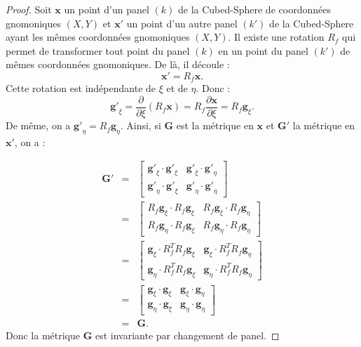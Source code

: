 \begin{proof}
Soit $\mathbf{x}$ un point d'un panel $(k)$ de la Cubed-Sphere de coordonnées gnomoniques $(X,Y)$ et $\mathbf{x}'$ un point d'un autre panel $(k')$ de la Cubed-Sphere ayant les mêmes coordonnées gnomoniques $(X,Y)$. Il existe une rotation $R_f$ qui permet de transformer tout point du panel $(k)$ en un point du panel $(k')$ de mêmes coordonnées gnomoniques. De là, il découle :
\begin{equation}
\mathbf{x}' = R_f \mathbf{x}.
\end{equation}
Cette rotation est indépendante de $\xi$ et de $\eta$. Donc :
\begin{equation}
\mathbf{g'}_{\xi} = \dfrac{\partial}{\partial \xi} \left( R_f \mathbf{x} \right) = R_f \dfrac{\partial \mathbf{x}}{\partial \xi}  = R_f \mathbf{g}_{\xi}.
\end{equation}
De même, on a $\mathbf{g'}_{\eta} = R_f\mathbf{g}_{\eta}$.
Ainsi, si $\mathbf{G}$ est la métrique en $\mathbf{x}$ et $\mathbf{G}'$ la métrique en $\mathbf{x}'$, on a :

\begin{equation*}
\begin{array}{rcl}
\mathbf{G}' &=& \begin{bmatrix}
\mathbf{g'}_{\xi} \cdot \mathbf{g'}_{\xi} & \mathbf{g'}_{\xi} \cdot \mathbf{g'}_{\eta} \\
\mathbf{g'}_{\eta} \cdot \mathbf{g'}_{\xi} & \mathbf{g'}_{\eta} \cdot \mathbf{g'}_{\eta}
\end{bmatrix}\\[10pt]
&=&
\begin{bmatrix}
R_f \mathbf{g}_{\xi} \cdot R_f \mathbf{g}_{\xi} & R_f \mathbf{g}_{\xi} \cdot R_f \mathbf{g}_{\eta} \\
R_f \mathbf{g}_{\eta} \cdot R_f \mathbf{g}_{\xi} & R_f \mathbf{g}_{\eta} \cdot R_f \mathbf{g}_{\eta}
\end{bmatrix}\\[10pt]
&=&
\begin{bmatrix}
\mathbf{g}_{\xi} \cdot R_f^{T} R_f \mathbf{g}_{\xi} & \mathbf{g}_{\xi} \cdot  R_f^{T} R_f \mathbf{g}_{\eta} \\
\mathbf{g}_{\eta} \cdot  R_f^{T} R_f \mathbf{g}_{\xi} & \mathbf{g}_{\eta} \cdot  R_f^{T} R_f \mathbf{g}_{\eta}
\end{bmatrix}\\[10pt]
&=& \begin{bmatrix}
\mathbf{g}_{\xi} \cdot \mathbf{g}_{\xi} & \mathbf{g}_{\xi} \cdot \mathbf{g}_{\eta} \\
\mathbf{g}_{\eta} \cdot \mathbf{g}_{\xi} & \mathbf{g}_{\eta} \cdot \mathbf{g}_{\eta}
\end{bmatrix}\\[10pt]
& = & \mathbf{G}.
\end{array}
\end{equation*}
Donc la métrique $\mathbf{G}$ est invariante par changement de panel.
\end{proof}
